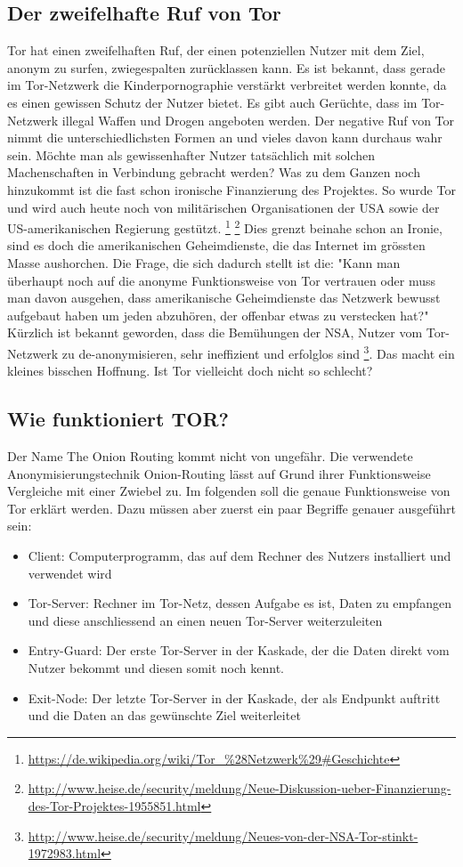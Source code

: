 \subsection{Der zweifelhafte Ruf von Tor}
Tor hat einen zweifelhaften Ruf, der einen potenziellen Nutzer mit dem Ziel, anonym zu surfen, zwiegespalten zurücklassen kann. Es ist bekannt, dass gerade im Tor-Netzwerk die Kinderpornographie verstärkt verbreitet werden konnte, da es einen gewissen Schutz der Nutzer bietet. Es gibt auch Gerüchte, dass im Tor-Netzwerk illegal Waffen und Drogen angeboten werden. Der negative Ruf von Tor nimmt die unterschiedlichsten Formen an und vieles davon kann durchaus wahr sein. Möchte man als gewissenhafter Nutzer tatsächlich mit solchen Machenschaften in Verbindung gebracht werden? Was zu dem Ganzen noch hinzukommt ist die fast schon ironische Finanzierung des Projektes. So wurde Tor und wird auch heute noch von militärischen Organisationen der USA sowie der US-amerikanischen Regierung  gestützt.
\footnote{\url{https://de.wikipedia.org/wiki/Tor_\%28Netzwerk\%29\#Geschichte}}
\footnote{\url{http://www.heise.de/security/meldung/Neue-Diskussion-ueber-Finanzierung-des-Tor-Projektes-1955851.html}} 
Dies grenzt beinahe schon an Ironie, sind es doch die amerikanischen Geheimdienste, die das Internet im grössten Masse aushorchen. Die Frage, die sich dadurch stellt ist die: "Kann man überhaupt noch auf die anonyme Funktionsweise von Tor vertrauen oder muss man davon ausgehen, dass amerikanische Geheimdienste das Netzwerk bewusst aufgebaut haben um jeden abzuhören, der offenbar etwas zu verstecken hat?" Kürzlich ist bekannt geworden, dass die Bemühungen der NSA, Nutzer vom Tor-Netzwerk zu de-anonymisieren, sehr ineffizient und erfolglos sind
\footnote{\url{http://www.heise.de/security/meldung/Neues-von-der-NSA-Tor-stinkt-1972983.html}}. 
Das macht ein kleines bisschen Hoffnung. Ist Tor vielleicht doch nicht so schlecht?

\subsection{Wie funktioniert TOR?}
Der Name The Onion Routing kommt nicht von ungefähr. Die verwendete Anonymisierungstechnik Onion-Routing lässt auf Grund ihrer Funktionsweise Vergleiche mit einer Zwiebel zu. Im folgenden soll die genaue Funktionsweise von Tor erklärt werden. Dazu müssen aber zuerst ein paar Begriffe genauer ausgeführt sein:
\begin{itemize}
\item Client: Computerprogramm, das auf dem Rechner des Nutzers installiert und verwendet wird
\item Tor-Server: Rechner im Tor-Netz, dessen Aufgabe es ist, Daten zu empfangen und diese anschliessend an einen neuen Tor-Server weiterzuleiten
\item Entry-Guard: Der erste Tor-Server in der Kaskade, der die Daten direkt vom Nutzer bekommt und diesen somit noch kennt.
\item Exit-Node: Der letzte Tor-Server in der Kaskade, der als Endpunkt auftritt und die Daten an das gewünschte Ziel weiterleitet
\end{itemize}

